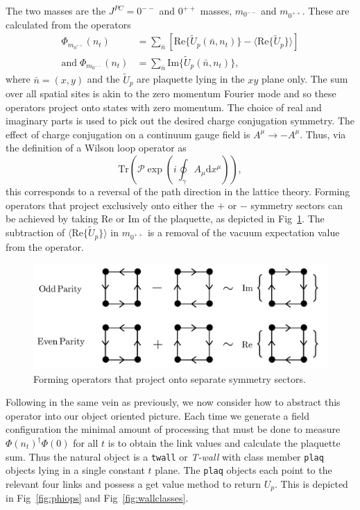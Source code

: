 \documentclass[12pt]{article}
\begin{document}
\par The two masses are the $J^{PC} = 0^{--}$ and $0^{++}$ masses, $m_{0^{--}}$ and $m_{0^{++}}$. These are calculated from the operators
\begin{align}
    \Phi_{m_{0^{++}}}(n_t) &= \sum_{\bar{n}} \left[  \mathrm{Re}\{\tilde{U}_p(\bar{n},n_t)\} - \langle \mathrm{Re}\{\tilde{U}_p\} \rangle \right]\\
    \mathrm{and} \; \Phi_{m_{0^{--}}}(n_t) &= \sum_{\bar{n}}  \mathrm{Im}\{\tilde{U}_p(\bar{n},n_t)\},
\end{align}
where $\bar{n} = (x,y)$ and the $\tilde{U}_p$ are plaquette lying in the $xy$ plane only. The sum over all spatial sites is akin to the zero momentum Fourier mode and so these operators project onto states with zero momentum. The choice of real and imaginary parts is used to pick out the desired charge conjugation symmetry. The effect of charge conjugation on a continuum gauge field is $A^{\mu} \rightarrow -A^{\mu}$. Thus, via the definition of a Wilson loop operator as
\begin{equation}
    \mathrm{Tr}\left(\mathcal{P}\exp\left(i\oint_{\gamma}A_{\mu}\mathrm{d}x^{\mu}\right)\right),
\end{equation}
this corresponds to a reversal of the path direction in the lattice theory. Forming operators that project exclusively onto either the $+$ or $-$ symmetry sectors can be achieved by taking Re or Im of the plaquette, as depicted in Fig~\ref{fig:reimparts}. The subtraction of $\langle \mathrm{Re}\{\tilde{U}_p\} \rangle$ in $m_{0^{++}}$ is a removal of the vacuum expectation value from the operator.

\begin{figure}
\centering
\includegraphics[width=0.8\linewidth]{reimparts.pdf}
\caption{\label{fig:reimparts} Forming operators that project onto separate symmetry sectors.}
\end{figure}


\par Following in the same vein as previously, we now consider how to abstract this operator into our object oriented picture. Each time we generate a field configuration the minimal amount of processing that must be done to measure $\Phi(n_t)^{\dagger}\Phi(0)$ for all $t$ is to obtain the link values and calculate the plaquette sum. Thus the natural object is a \texttt{twall} or \emph{T-wall} with class member \texttt{plaq} objects lying in a single constant $t$ plane. The \texttt{plaq} objects each point to the relevant four links and possess a get value method to return $U_p$. This is depicted in Fig~\ref{fig:phiops} and Fig~\ref{fig:wallclasses}.
\end{document}
